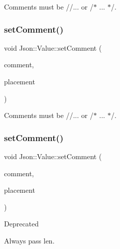 Comments must be //... or /$\ast$ ... $\ast$/. 

\hypertarget{class_json_1_1_value_a2c5d13a5f45eb77e912008778e65b27f}{}\label{class_json_1_1_value_a2c5d13a5f45eb77e912008778e65b27f} 
\subsubsection{\texorpdfstring{set\+Comment()}{setComment()}\hspace{0.1cm}{\footnotesize\ttfamily [3/6]}}
{\footnotesize\ttfamily void Json\+::\+Value\+::set\+Comment (\begin{DoxyParamCaption}\item[{const \hyperlink{config_8h_a1e723f95759de062585bc4a8fd3fa4be}{J\+S\+O\+N\+C\+P\+P\+\_\+\+S\+T\+R\+I\+NG} \&}]{comment,  }\item[{\hyperlink{namespace_json_a4fc417c23905b2ae9e2c47d197a45351}{Comment\+Placement}}]{placement }\end{DoxyParamCaption})}



Comments must be //... or /$\ast$ ... $\ast$/. 

\hypertarget{class_json_1_1_value_a29f3a30f7e5d3af6f38d57999bf5b480}{}\label{class_json_1_1_value_a29f3a30f7e5d3af6f38d57999bf5b480} 
\subsubsection{\texorpdfstring{set\+Comment()}{setComment()}\hspace{0.1cm}{\footnotesize\ttfamily [4/6]}}
{\footnotesize\ttfamily void Json\+::\+Value\+::set\+Comment (\begin{DoxyParamCaption}\item[{const char $\ast$}]{comment,  }\item[{\hyperlink{namespace_json_a4fc417c23905b2ae9e2c47d197a45351}{Comment\+Placement}}]{placement }\end{DoxyParamCaption})}

\begin{DoxyRefDesc}{Deprecated}
\item[\hyperlink{deprecated__deprecated000003}{Deprecated}]Always pass len. \end{DoxyRefDesc}


